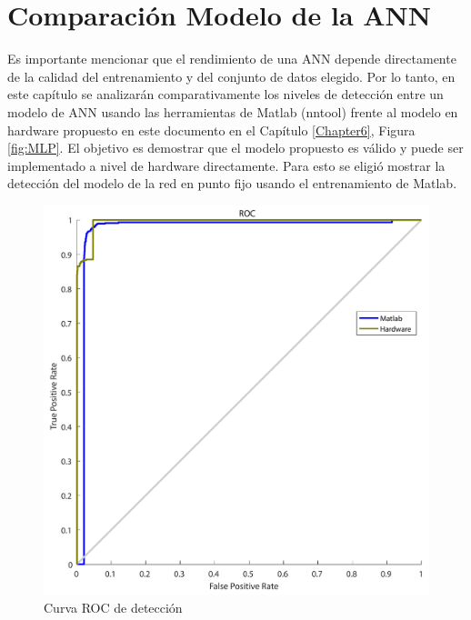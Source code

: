 
\chapter{Comparación Modelo de la ANN} %
\label{Chapter12}


Es importante mencionar que el rendimiento de una ANN depende directamente de la calidad del entrenamiento y del conjunto de datos elegido. Por lo tanto, en este capítulo se analizarán comparativamente los niveles de detección entre un modelo de ANN usando las herramientas de Matlab (nntool) frente al modelo en hardware propuesto en este documento en el Capítulo \ref{Chapter6}, Figura \ref{fig:MLP}. El objetivo es demostrar que el modelo propuesto es válido y puede ser implementado a nivel de hardware directamente. Para esto se eligió mostrar la detección del modelo de la red en punto fijo usando el entrenamiento de Matlab.

\begin{figure}[!ht]
	\centering
		\includegraphics[scale=0.35]{./Figures/ROCANN}
	\caption{Curva ROC de detección}
	\label{fig:ROC}
\end{figure}

